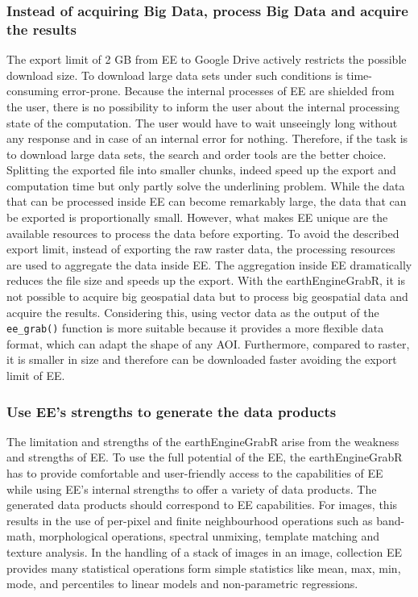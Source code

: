 \subsubsection{Instead of acquiring Big Data, process Big Data and acquire the results}

The export limit of 2 GB from EE to Google Drive actively restricts the possible download size. To download large data sets under such conditions is time-consuming error-prone. Because the internal processes of EE are shielded from the user, there is no possibility to inform the user about the internal processing state of the computation. The user would have to wait unseeingly long without any response and in case of an internal error for nothing.
Therefore, if the task is to download large data sets, the search and order tools are the better choice.
Splitting the exported file into smaller chunks, indeed speed up the export and computation time but only partly solve the underlining problem.
While the data that can be processed inside EE can become remarkably large, the data that can be exported is proportionally small.
However, what makes EE unique are the available resources to process the data before exporting. 
To avoid the described export limit, instead of exporting the raw raster data, the processing resources are used to aggregate the data inside EE.  The aggregation inside EE dramatically reduces the file size and speeds up the export. 
With the earthEngineGrabR, it is not possible to acquire big geospatial data but to process big geospatial data and acquire the results.
Considering this, using vector data as the output of the \texttt{ee\_grab()} function is more suitable because it provides a more flexible data format, which can adapt the shape of any AOI. Furthermore, compared to raster, it is smaller in size and therefore can be downloaded faster avoiding the export limit of EE. 

\subsubsection{Use EE's strengths to generate the data products}

The limitation and strengths of the earthEngineGrabR arise from the weakness and strengths of EE.
To use the full potential of the EE, the earthEngineGrabR has to provide comfortable and user-friendly access to the capabilities of EE while using EE's internal strengths to offer a variety of data products.
The generated data products should correspond to EE capabilities. For images, this results in the use of per-pixel and finite neighbourhood operations such as band-math, morphological operations, spectral unmixing, template matching and texture analysis.
In the handling of a stack of images in an image, collection EE provides many statistical operations form simple statistics like mean, max, min, mode, and percentiles to linear models and non-parametric regressions.

